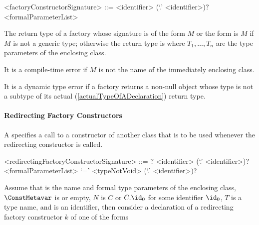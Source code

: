 \documentclass[makeidx]{article}
\begin{document}
\begin{grammar}
<factoryConstructorSignature> ::= \gnewline{}
  \FACTORY{} <identifier> (`.' <identifier>)? <formalParameterList>
\end{grammar}


\LMHash{}%
The return type of a factory whose signature is of the form \FACTORY{} $M$ or the form \FACTORY{}  is $M$ if $M$ is not a generic type;
otherwise the return type is  where $T_1, \ldots, T_n$ are the type parameters of the enclosing class.

\LMHash{}%
It is a compile-time error if $M$ is not the name of the immediately enclosing class.

\LMHash{}%
It is a dynamic type error if a factory returns a non-null object
whose type is not a subtype of its actual
(\ref{actualTypeOfADeclaration})
return type.




\paragraph{Redirecting Factory Constructors}

\LMHash{}%
A 
specifies a call to a constructor of another class that is to be used
whenever the redirecting constructor is called.

\begin{grammar}
<redirectingFactoryConstructorSignature> ::= \gnewline{}
  \CONST{}? \FACTORY{} <identifier> (`.' <identifier>)? <formalParameterList> `='
  \gnewline{} <typeNotVoid> (`.' <identifier>)?
\end{grammar}

Assume that
is the name and formal type parameters of the enclosing class,
$\ConstMetavar$ is \CONST{} or empty,
$N$ is $C$ or $C.\id_0$ for some identifier $\id_0$,
$T$ is a type name, and \id{} is an identifier,
then consider a declaration of a redirecting factory constructor $k$ of one of the forms
\end{document}
